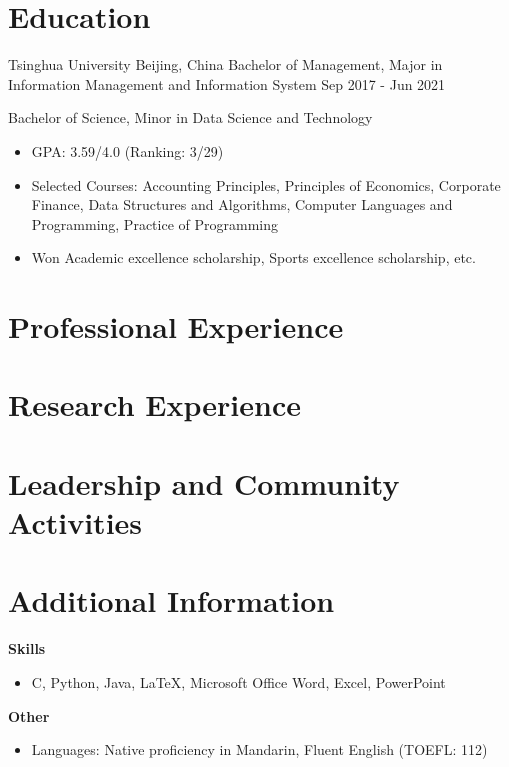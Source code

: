 \documentclass{resumeEN}
\begin{document}

\section{Education}

\Experience
{Tsinghua University}
{Beijing, China}
{Bachelor of Management, Major in Information Management and Information System}
{Sep 2017 - Jun 2021}

Bachelor of Science, Minor in Data Science and Technology
\begin{itemize}
    \item GPA: 3.59/4.0 (Ranking: 3/29)
    \item Selected Courses: Accounting Principles, Principles of Economics, Corporate Finance, Data Structures and Algorithms, Computer Languages and Programming, Practice of Programming
    \item Won Academic excellence scholarship, Sports excellence scholarship, etc.
\end{itemize}

\section{Professional Experience}

\summitview

\section{Research Experience}

\fifaresearch

\section{Leadership and Community Activities}

\cydp

\tkd

\semtech

\section{Additional Information}
\vspace{0.618ex}
\textbf{Skills}
\begin{itemize}
    \item C, Python, Java, {\LaTeX}, Microsoft Office Word, Excel, PowerPoint
\end{itemize}
\textbf{Other}
\begin{itemize}
    \item Languages: Native proficiency in Mandarin, Fluent English (TOEFL: 112)
\end{itemize}
\end{document}
